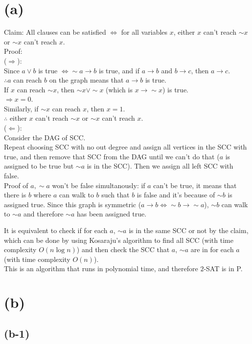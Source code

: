 \section*{(a)}
\noindent
Claim: All clauses can be satisfied $\iff$ for all variables $x$, either $x$ can't reach $\sim x$ or $\sim x$ can't reach $x$.\\
Proof:\\
($\Rightarrow$):\\
Since $a\lor b$ is true $\iff\sim a\to b$ is true, and if $a\to b$ and $b\to c$, then $a\to c$.\\
$\therefore a$ can reach $b$ on the graph means that $a\to b$ is true.\\
If $x$ can reach $\sim x$, then $\sim x\lor\sim x$ (which is $x\to\sim x$) is true.\\
$\Rightarrow x=0$.\\
Similarly, if $\sim x$ can reach $x$, then $x=1$.\\
$\therefore$ either $x$ can't reach $\sim x$ or $\sim x$ can't reach $x$.\\
($\Leftarrow$):\\
Consider the DAG of SCC.\\
Repeat choosing SCC with no out degree and assign all vertices in the SCC with true, and then remove that SCC from the DAG until we can't do that ($a$ is assigned to be true but $\sim a$ is in the SCC). Then we assign all left SCC with false.\\
Proof of $a, \sim a$ won't be false simultanously: if $a$ can't be true, it means that there is $b$ where $a$ can walk to $b$ such that $b$ is false and it's because of $\sim b$ is assigned true. Since this graph is symmetric ($a\to b\iff\sim b\to\sim a$), $\sim b$ can walk to $\sim a$ and therefore $\sim a$ has been assigned true.

It is equivalent to check if for each $a$, $\sim a$ is in the same SCC or not by the claim, which can be done by using Kosaraju's algorithm to find all SCC (with time complexity $O(n\log n)$) and then check the SCC that $a$, $\sim a$ are in for each $a$ (with time complexity $O(n)$).\\
This is an algorithm that runs in polynomial time, and therefore $2$-SAT is in P.

\section*{(b)}

\subsection*{(b-1)}

